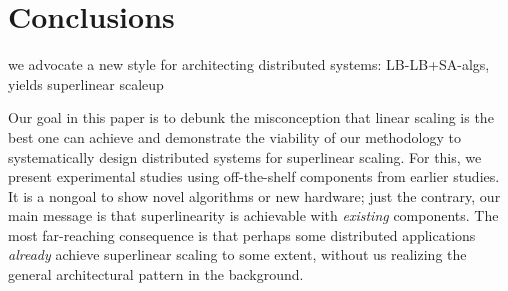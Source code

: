 \section{Conclusions}\label{sec:conclusions}

we advocate a new style for architecting distributed systems: LB-LB+SA-algs, yields superlinear scaleup

Our goal in this paper is to debunk the misconception that linear scaling is the best one can achieve and demonstrate the viability of our methodology to systematically design distributed systems for superlinear scaling. For this, we present experimental studies using off-the-shelf components from earlier studies. It is a nongoal to show novel algorithms or new hardware; just the contrary, our main message is that superlinearity is achievable with \emph{existing} components. The most far-reaching consequence is that perhaps some distributed applications \emph{already} achieve superlinear scaling to some extent, without us realizing the general architectural pattern in the background.


